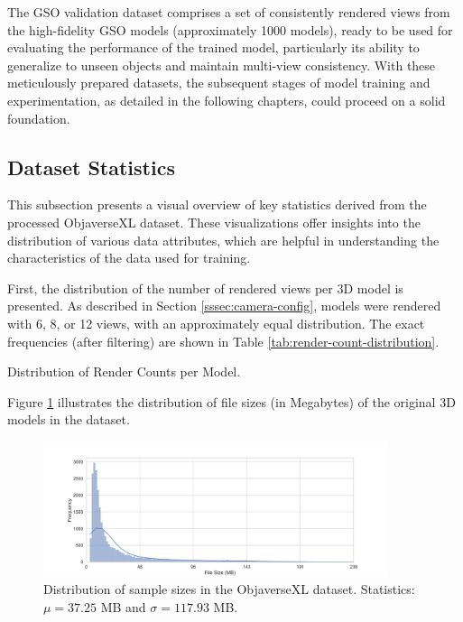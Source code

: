 The GSO validation dataset comprises a set of consistently rendered views from the high-fidelity GSO models (approximately 1000 models), ready to be used for evaluating the performance of the trained model, particularly its ability to generalize to unseen objects and maintain multi-view consistency.
With these meticulously prepared datasets, the subsequent stages of model training and experimentation, as detailed in the following chapters, could proceed on a solid foundation.

\subsection{Dataset Statistics}\label{ssec:dataset-statistics}
This subsection presents a visual overview of key statistics derived from the processed ObjaverseXL dataset. These visualizations offer insights into the distribution of various data attributes, which are helpful in understanding the characteristics of the data used for training.

First, the distribution of the number of rendered views per 3D model is presented. As described in Section \ref{sssec:camera-config}, models were rendered with 6, 8, or 12 views, with an approximately equal distribution. The exact frequencies (after filtering) are shown in Table \ref{tab:render-count-distribution}.

\begin{table}[h]
  \centering
  \caption{Distribution of Render Counts per Model.}
  \label{tab:render-count-distribution}
\end{table}

Figure \ref{fig:dist-file-size} illustrates the distribution of file sizes (in Megabytes) of the original 3D models in the dataset.

\begin{figure}[h]
  \centering
  \includegraphics[width=0.9\textwidth]{images/data/objaverse_visualizations/distribution_file_size_bytes.png}
  \caption{Distribution of sample sizes in the ObjaverseXL dataset. Statistics: $\mu = 37.25$ MB and $\sigma = 117.93$ MB.}
  \label{fig:dist-file-size}
\end{figure}

